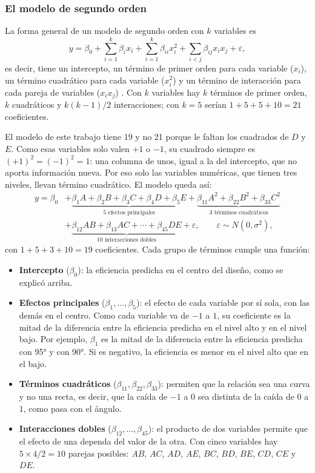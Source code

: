 \subsubsection{El modelo de segundo orden}

La forma general de un modelo de segundo orden con $k$ variables es
\begin{equation}
y = \beta_0 + \sum_{i=1}^{k} \beta_i x_i + \sum_{i=1}^{k} \beta_{ii} x_i^2 + \sum_{i<j} \beta_{ij} x_i x_j + \varepsilon,
\label{eq:general}
\end{equation}
es decir, tiene un intercepto, un término de primer orden para cada variable ($x_i$), un término cuadrático para cada variable ($x_i^2$) y un término de interacción para cada pareja de variables ($x_i x_j$) \citep{Montgomery2005}. Con $k$ variables hay $k$ términos de primer orden, $k$ cuadráticos y $k(k-1)/2$ interacciones; con $k = 5$ serían $1 + 5 + 5 + 10 = 21$ coeficientes.

El modelo de este trabajo tiene 19 y no 21 porque le faltan los cuadrados de $D$ y $E$. Como esas variables solo valen $+1$ o $-1$, su cuadrado siempre es $(+1)^2 = (-1)^2 = 1$: una columna de unos, igual a la del intercepto, que no aporta información nueva. Por eso solo las variables numéricas, que tienen tres niveles, llevan término cuadrático. El modelo queda así:
\begin{align}
y = \beta_0
&+ \underbrace{\beta_1 A + \beta_2 B + \beta_3 C + \beta_4 D + \beta_5 E}_{\text{5 efectos principales}}
 + \underbrace{\beta_{11} A^2 + \beta_{22} B^2 + \beta_{33} C^2}_{\text{3 términos cuadráticos}} \nonumber \\
&+ \underbrace{\beta_{12} AB + \beta_{13} AC + \cdots + \beta_{45} DE}_{\text{10 interacciones dobles}}
 + \varepsilon, \qquad \varepsilon \sim N(0, \sigma^2),
\label{eq:modelo2}
\end{align}
con $1 + 5 + 3 + 10 = 19$ coeficientes. Cada grupo de términos cumple una función:
\begin{itemize}
  \item \textbf{Intercepto} ($\beta_0$): la eficiencia predicha en el centro del diseño, como se explicó arriba.
  \item \textbf{Efectos principales} ($\beta_1, \ldots, \beta_5$): el efecto de cada variable por sí sola, con las demás en el centro. Como cada variable va de $-1$ a $1$, su coeficiente es la mitad de la diferencia entre la eficiencia predicha en el nivel alto y en el nivel bajo. Por ejemplo, $\beta_1$ es la mitad de la diferencia entre la eficiencia predicha con 95° y con 90°. Si es negativo, la eficiencia es menor en el nivel alto que en el bajo.
  \item \textbf{Términos cuadráticos} ($\beta_{11}, \beta_{22}, \beta_{33}$): permiten que la relación sea una curva y no una recta, es decir, que la caída de $-1$ a $0$ sea distinta de la caída de $0$ a $1$, como pasa con el ángulo.
  \item \textbf{Interacciones dobles} ($\beta_{12}, \ldots, \beta_{45}$): el producto de dos variables permite que el efecto de una dependa del valor de la otra. Con cinco variables hay $5 \times 4 / 2 = 10$ parejas posibles: $AB$, $AC$, $AD$, $AE$, $BC$, $BD$, $BE$, $CD$, $CE$ y $DE$.
\end{itemize}

